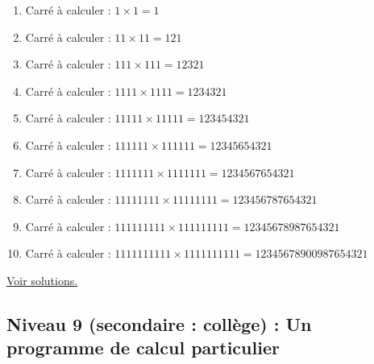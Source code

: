 \documentclass[11pt]{article}
\begin{document}
\label{orgd694eea}


\begin{enumerate}
\item Carré à calculer : \(1 \times 1 =  1\)
\item Carré à calculer : \(11 \times 11 = 121\)
\item Carré à calculer : \(111 \times 111 = 12321\)
\item Carré à calculer : \(1111 \times 1111 = 1234321\)
\item Carré à calculer : \(11111 \times 11111 = 123454321\)
\item Carré à calculer : \(111111 \times 111111 = 12345654321\)
\item Carré à calculer : \(1111111 \times 1111111 = 1234567654321\)
\item Carré à calculer : \(11111111 \times 11111111 = 123456787654321\)
\item Carré à calculer : \(111111111 \times 111111111 = 12345678987654321\)
\item Carré à calculer : \(1111111111 \times 1111111111 = 12345678900987654321\)
\end{enumerate}



\hyperref[org8362719]{Voir solutions.}







\newpage

\subsection{Niveau 9 (secondaire : collège) : Un programme de calcul particulier}
\label{sec:org30661a4}

\label{org2ddd170}
\end{document}
